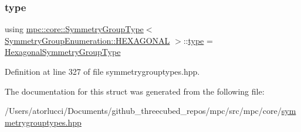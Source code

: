 \subsubsection{\texorpdfstring{type}{type}}
{\footnotesize\ttfamily using \mbox{\hyperlink{structmpc_1_1core_1_1_symmetry_group_type}{mpc\+::core\+::\+Symmetry\+Group\+Type}}$<$ \mbox{\hyperlink{namespacempc_1_1core_a9d979684062547055a0ef5c13077bad8a5d7adeeaa10073a6a3c5bd970a7f958b}{Symmetry\+Group\+Enumeration\+::\+H\+E\+X\+A\+G\+O\+N\+AL}} $>$\+::\mbox{\hyperlink{structmpc_1_1core_1_1_symmetry_group_type_3_01_symmetry_group_enumeration_1_1_h_e_x_a_g_o_n_a_l_01_4_a833ac3714c5e0f497d4f8509d20ac6aa}{type}} =  \mbox{\hyperlink{structmpc_1_1core_1_1_hexagonal_symmetry_group_type}{Hexagonal\+Symmetry\+Group\+Type}}}



Definition at line 327 of file symmetrygrouptypes.\+hpp.



The documentation for this struct was generated from the following file\+:\begin{DoxyCompactItemize}
\item 
/\+Users/atorlucci/\+Documents/github\+\_\+threecubed\+\_\+repos/mpc/src/mpc/core/\mbox{\hyperlink{symmetrygrouptypes_8hpp}{symmetrygrouptypes.\+hpp}}\end{DoxyCompactItemize}
